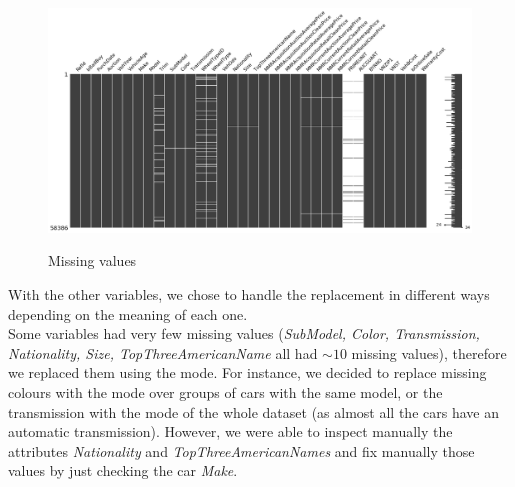 \documentclass{article}
\begin{document}
	\begin{figure}[]
		\centering
		{\includegraphics[width=.95\textwidth, keepaspectratio]{missingv.png}}
		\caption{{ Missing values }}
		\label{fig:missingval}
	\end{figure}
	
	With the other variables, we chose to handle the replacement in different ways depending on the meaning of each one. \\
	Some variables had very few missing values (\emph{SubModel, Color, Transmission, Nationality, Size, TopThreeAmericanName} all had $\sim 10$ missing values), therefore we replaced them using the mode. For instance, we decided to replace missing colours with the mode over groups of cars with the same model, or the transmission with the mode of the whole dataset (as almost all the cars have an automatic transmission). However, we were able to inspect manually the attributes \emph{Nationality} and \emph{TopThreeAmericanNames} and fix manually those values by just checking the car \emph{Make}.\\
	
\end{document}
